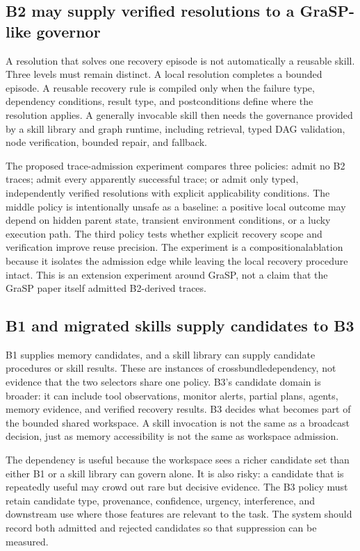 \subsection{B2 may supply verified resolutions to a GraSP-like governor}
\label{subsec:ch18-b2-to-grasp}

A resolution that solves one recovery episode is not automatically a reusable skill. Three levels must remain distinct. A local resolution completes a bounded episode. A reusable recovery rule is compiled only when the failure type, dependency conditions, result type, and postconditions define where the resolution applies. A generally invocable skill then needs the governance provided by a skill library and graph runtime, including retrieval, typed DAG validation, node verification, bounded repair, and fallback.

The proposed trace-admission experiment compares three policies: admit no B2 traces; admit every apparently successful trace; or admit only typed, independently verified resolutions with explicit applicability conditions. The middle policy is intentionally unsafe as a baseline: a positive local outcome may depend on hidden parent state, transient environment conditions, or a lucky execution path. The third policy tests whether explicit recovery scope and verification improve reuse precision. The experiment is a \gls{compositionalablation} because it isolates the admission edge while leaving the local recovery procedure intact. This is an extension experiment around GraSP, not a claim that the GraSP paper itself admitted B2-derived traces.

\subsection{B1 and migrated skills supply candidates to B3}
\label{subsec:ch18-supply-b3}

B1 supplies memory candidates, and a skill library can supply candidate procedures or skill results. These are instances of \gls{crossbundledependency}, not evidence that the two selectors share one policy. B3's candidate domain is broader: it can include tool observations, monitor alerts, partial plans, agents, memory evidence, and verified recovery results. B3 decides what becomes part of the bounded shared workspace. A skill invocation is not the same as a broadcast decision, just as memory accessibility is not the same as workspace admission.

The dependency is useful because the workspace sees a richer candidate set than either B1 or a skill library can govern alone. It is also risky: a candidate that is repeatedly useful may crowd out rare but decisive evidence. The B3 policy must retain candidate type, provenance, confidence, urgency, interference, and downstream use where those features are relevant to the task. The system should record both admitted and rejected candidates so that suppression can be measured.

